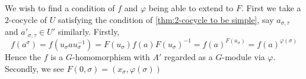 \begin{analysis}
    We wish to find a condition of $f$ and $\varphi$ being able to extend to $F$. First we take a $2$-cocycle of $U$ satisfying the condition of \cref{thm:2-cocycle to be simple}, say $a_{\sigma,\tau}$ and $a'_{\sigma,\tau}\in U'$ similarly. Firstly, $$ f(a^\sigma)=f(u_\sigma au_\sigma^{-1})=F(u_\sigma)f(a)F(u_\sigma)^{-1}=f(a)^{F(u_\sigma)}=f(a)^{\varphi(\sigma)} $$ Hence the $f$ is a $G$-homomorphism with $A'$ regarded as a $G$-module via $\varphi$. Secondly, we see $F(0,\sigma)=(x_\sigma,\varphi(\sigma))$
\end{analysis}
